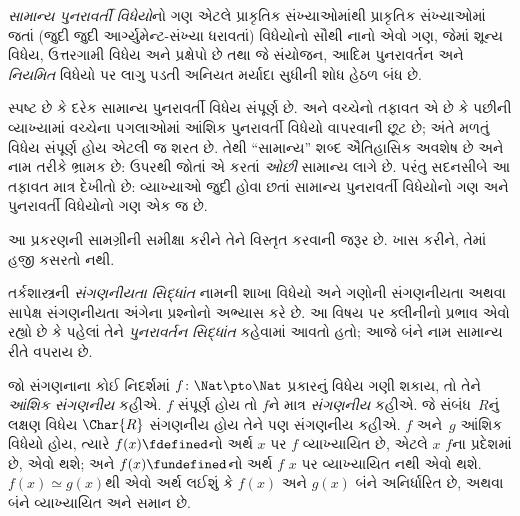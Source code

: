 \begin{defn}
\emph{સામાન્ય પુનરાવર્તી વિધેયો}નો ગણ એટલે પ્રાકૃતિક
સંખ્યાઓમાંથી પ્રાકૃતિક સંખ્યાઓમાં જતાં (જુદી જુદી
આર્ગ્યુમેન્ટ-સંખ્યા ધરાવતાં) વિધેયોનો સૌથી નાનો એવો ગણ, જેમાં
શૂન્ય વિધેય, ઉત્તરગામી વિધેય અને પ્રક્ષેપો છે તથા જે સંયોજન,
આદિમ પુનરાવર્તન અને \emph{નિયમિત} વિધેયો પર લાગુ પડતી અનિયત
મર્યાદા સુધીની શોધ હેઠળ બંધ છે.
\end{defn}

સ્પષ્ટ છે કે દરેક સામાન્ય પુનરાવર્તી વિધેય સંપૂર્ણ છે.
 અને
 વચ્ચેનો તફાવત એ છે કે પછીની
વ્યાખ્યામાં વચ્ચેના પગલાઓમાં આંશિક પુનરાવર્તી વિધેયો વાપરવાની
છૂટ છે; અંતે મળતું વિધેય સંપૂર્ણ હોય એટલી જ શરત છે. તેથી
``સામાન્ય'' શબ્દ ઐતિહાસિક અવશેષ છે અને નામ તરીકે ભ્રામક છે:
ઉપરથી જોતાં  એ
 કરતાં \emph{ઓછી} સામાન્ય લાગે છે.
પરંતુ સદનસીબે આ તફાવત માત્ર દેખીતો છે: વ્યાખ્યાઓ જુદી હોવા
છતાં સામાન્ય પુનરાવર્તી વિધેયોનો ગણ અને પુનરાવર્તી વિધેયોનો
ગણ એક જ છે.
\endgroup


\OLEndChapterHook
\endgroup


\begingroup
\makeatletter{}\makeatother

\label{guunit:OLP-0228}


\begin{editorial}
  આ પ્રકરણની સામગ્રીની સમીક્ષા કરીને તેને વિસ્તૃત કરવાની જરૂર છે.
  ખાસ કરીને, તેમાં હજી કસરતો નથી.
\end{editorial}

\begingroup
\makeatletter{}\makeatother

\label{guunit:OLP-0229}


તર્કશાસ્ત્રની \emph{સંગણનીયતા સિદ્ધાંત} નામની શાખા વિધેયો અને ગણોની
સંગણનીયતા અથવા સાપેક્ષ સંગણનીયતા અંગેના પ્રશ્નોનો અભ્યાસ કરે છે.
આ વિષય પર ક્લીનીનો પ્રભાવ એવો રહ્યો છે કે પહેલાં તેને \emph{પુનરાવર્તન
  સિદ્ધાંત} કહેવામાં આવતો હતો; આજે બંને નામ સામાન્ય રીતે વપરાય છે.

જો સંગણનાના કોઈ નિદર્શમાં $f\colon \Nat \pto \Nat$ પ્રકારનું વિધેય
ગણી શકાય, તો તેને \emph{આંશિક સંગણનીય} કહીએ. $f$ સંપૂર્ણ હોય તો
$f$ને માત્ર \emph{સંગણનીય} કહીએ. જે સંબંધ~$R$નું લક્ષણ વિધેય
$\Char{R}$ સંગણનીય હોય તેને પણ સંગણનીય કહીએ. $f$ અને~$g$ આંશિક
વિધેયો હોય, ત્યારે $f(x) \fdefined$નો અર્થ $x$ પર $f$ વ્યાખ્યાયિત
છે, એટલે $x$ $f$ના પ્રદેશમાં છે, એવો થશે; અને $f(x) \fundefined$નો
અર્થ $f$ $x$ પર વ્યાખ્યાયિત નથી એવો થશે. $f(x) \simeq g(x)$થી એવો અર્થ લઈશું કે
$f(x)$ અને $g(x)$ બંને અનિર્ધારિત છે, અથવા બંને વ્યાખ્યાયિત અને
સમાન છે.

